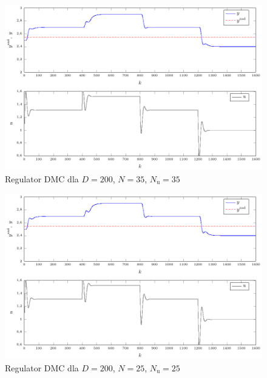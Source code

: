 \begin{figure}[tb] 
\centering 
\includegraphics[scale=1]{rysunki/zapisz_pdf/DMC_D=200.000_N=35.00_Nu=35.00.pdf} 
\caption{Regulator DMC dla $D=200$, $N=35$, $N_{\mathrm{u}}=35$} 
\label{r_pgfplots_DMC_D=200.000_N=35.00_Nu=35.00} 
\end{figure}

\begin{figure}[tb] 
\centering 
\includegraphics[scale=1]{rysunki/zapisz_pdf/DMC_D=200.000_N=25.00_Nu=25.00.pdf} 
\caption{Regulator DMC dla $D=200$, $N=25$, $N_{\mathrm{u}}=25$} 
\label{r_pgfplots_DMC_D=200.000_N=25.00_Nu=25.00} 
\end{figure}

